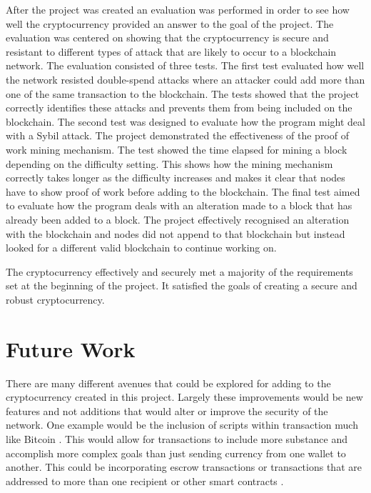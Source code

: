 \documentclass{l4proj}
\begin{document}
After the project was created an evaluation was performed in order to see how well the cryptocurrency provided an answer
to the goal of the project. The evaluation was centered on showing that the cryptocurrency is secure and resistant to 
different types of attack that are likely to occur to a blockchain network. The evaluation consisted of three tests.
The first test evaluated how well the network resisted double-spend attacks where an attacker could add more than one
of the same transaction to the blockchain. The tests showed that the project correctly identifies these attacks and
prevents them from being included on the blockchain. The second test was designed to evaluate how the program might
deal with a Sybil attack. The project demonstrated the effectiveness of the proof of work mining mechanism. The test 
showed the time elapsed for mining a block depending on the difficulty setting. This shows how the mining mechanism 
correctly takes longer as the difficulty increases and makes it clear that nodes have to show proof of work before
adding to the blockchain. The final test aimed to evaluate how the program deals with an alteration made to a block
that has already been added to a block. The project effectively recognised an alteration with the blockchain and 
nodes did not append to that blockchain but instead looked for a different valid blockchain to continue working on.

The cryptocurrency effectively and securely met a majority of the requirements set at the beginning of the project. It
satisfied the goals of creating a secure and robust cryptocurrency.


\section{Future Work}

There are many different avenues that could be explored for adding to the cryptocurrency created in this project. 
Largely these improvements would be new features and not additions that would alter or improve the security of the
network. One example would be the inclusion of scripts within transaction much like Bitcoin \citep{nakamoto2019bitcoin}. This would
allow for transactions to include more substance and accomplish more complex goals than just sending currency from 
one wallet to another. This could be incorporating escrow transactions or transactions that are addressed to more than
one recipient or other smart contracts \citep{narayanan2016bitcoin}.
\end{document}
